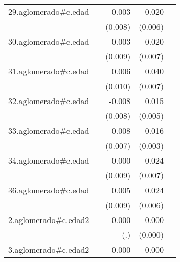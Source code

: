 {\begin{longtable}{l*{4}{D{.}{.}{-1}}}
\addlinespace
29.aglomerado#c.edad&                     &      -0.003         &       0.020\sym{***}&                     \\
            &                     &     (0.008)         &     (0.006)         &                     \\
\addlinespace
30.aglomerado#c.edad&                     &      -0.003         &       0.020\sym{**} &                     \\
            &                     &     (0.009)         &     (0.007)         &                     \\
\addlinespace
31.aglomerado#c.edad&                     &       0.006         &       0.040\sym{***}&                     \\
            &                     &     (0.010)         &     (0.007)         &                     \\
\addlinespace
32.aglomerado#c.edad&                     &      -0.008         &       0.015\sym{**} &                     \\
            &                     &     (0.008)         &     (0.005)         &                     \\
\addlinespace
33.aglomerado#c.edad&                     &      -0.008         &       0.016\sym{***}&                     \\
            &                     &     (0.007)         &     (0.003)         &                     \\
\addlinespace
34.aglomerado#c.edad&                     &       0.000         &       0.024\sym{***}&                     \\
            &                     &     (0.009)         &     (0.007)         &                     \\
\addlinespace
36.aglomerado#c.edad&                     &       0.005         &       0.024\sym{***}&                     \\
            &                     &     (0.009)         &     (0.006)         &                     \\
\addlinespace
2.aglomerado#c.edad2&                     &       0.000         &      -0.000\sym{*}  &                     \\
            &                     &         (.)         &     (0.000)         &                     \\
\addlinespace
3.aglomerado#c.edad2&                     &      -0.000         &      -0.000\sym{***}&                     \\

\end{longtable}}

